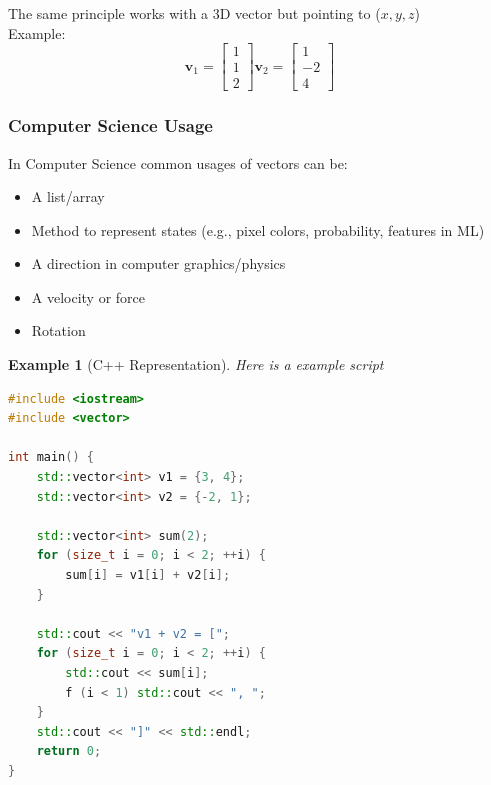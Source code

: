 \documentclass[12pt]{article}
\newtheorem{example}{Example}[section]
\begin{document}
            The same principle works with a 3D vector but pointing to ($x, y, z$) \\
            Example:
            \begin{equation}
                \mathbf{v}_1 = \begin{bmatrix} 1 \\ 1 \\ 2 \end{bmatrix}
                \mathbf{v}_2 = \begin{bmatrix} 1 \\ -2 \\ 4 \end{bmatrix}
            \end{equation}

        \subsubsection{Computer Science Usage}
            In Computer Science common usages of vectors can be:
            \begin{itemize}
                \item A list/array
                \item Method to represent states (e.g., pixel colors, probability, features in ML)
                \item A direction in computer graphics/physics
                \item A velocity or force
                \item Rotation
            \end{itemize}

            \begin{example}[C++ Representation] 
            Here is a example script
            \begin{lstlisting}[language=C++]
#include <iostream>
#include <vector>

int main() {
    std::vector<int> v1 = {3, 4};
    std::vector<int> v2 = {-2, 1};

    std::vector<int> sum(2);
    for (size_t i = 0; i < 2; ++i) {
        sum[i] = v1[i] + v2[i];
    }

    std::cout << "v1 + v2 = [";
    for (size_t i = 0; i < 2; ++i) {
        std::cout << sum[i];
        f (i < 1) std::cout << ", ";
    }
    std::cout << "]" << std::endl;
    return 0;
}
            \end{lstlisting}
            \end{example}
\end{document}
